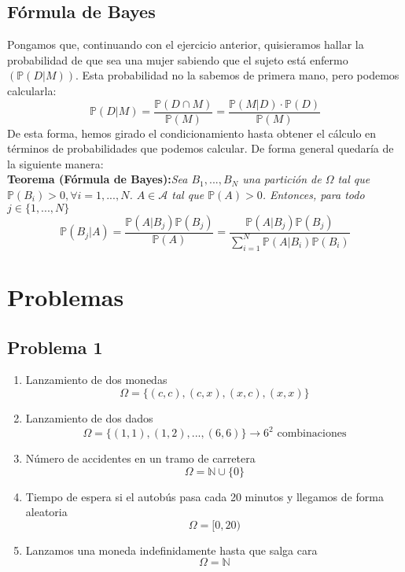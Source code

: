 \documentclass[11pt]{article}
\newcommand{\N}{\mathbb{N}}
\newcommand{\prob}{\mathbb{P}}
\newcommand{\OMG}{\varOmega}
\theoremstyle{plain}
\begin{document}
        \subsection{Fórmula de Bayes} %
        \label{sub:fórmula_de_bayes}
            Pongamos que, continuando con el ejercicio anterior, quisieramos hallar la probabilidad de que sea una mujer sabiendo que el sujeto está enfermo $(\prob(D|M))$. Esta probabilidad no la sabemos de primera mano, pero podemos calcularla:
            \[\prob (D|M) = \frac{\prob(D \cap M)}{\prob (M)} = \frac{\prob(M|D) \cdot \prob(D)}{\prob(M)}\]
            De esta forma, hemos girado el condicionamiento hasta obtener el cálculo en términos de probabilidades que podemos calcular. De forma general quedaría de la siguiente manera:\\

            \textbf{Teorema (Fórmula de Bayes):}\textit{Sea $B_1,...,B_N$ una partición de $\OMG$ tal que $\prob(B_i)>0, \forall i = 1,...,N$. $A \in \mathcal{A}$ tal que $\prob(A) >0$. Entonces, para todo $j \in \{1,...,N\}$}
            \begin{equation}
                \prob (B_j|A) = \frac{\prob(A|B_j)\prob(B_j)}{\prob(A)} = \frac{\prob(A|B_j)\prob(B_j)}{\sum_{i=1}^{N} \prob(A|B_i)\prob(B_i)}
            \end{equation}



    \newpage
    \section{Problemas} %
    \label{sec:problemas}
        \subsection{Problema 1} %
        \label{sub:problema_1}
            \begin{enumerate}[label=\Alph*]
                \item Lanzamiento de dos monedas \[\OMG = \{(c,c),(c,x),(x,c),(x,x)\}\]
                \item Lanzamiento de dos dados \[\OMG = \{(1,1),(1,2),...,(6,6)\} \rightarrow 6^2 \text{ combinaciones}\]
                \item Número de accidentes en un tramo de carretera \[\OMG = \N \cup \{0\}\]
                \item Tiempo de espera si el autobús pasa cada 20 minutos y llegamos de forma aleatoria \[\OMG = [0,20)\]
                \item Lanzamos una moneda indefinidamente hasta que salga cara \[\OMG = \N\] 
            \end{enumerate}        
\end{document}
